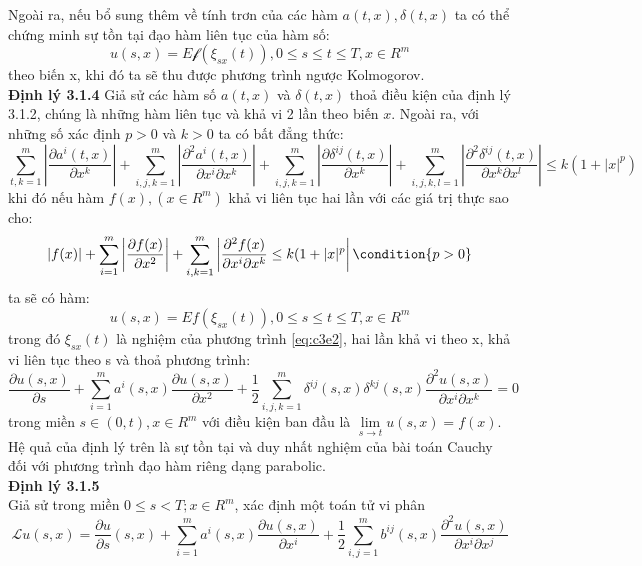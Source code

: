 \documentclass[14pt,a4paper]{article}
\numberwithin{equation}{section}
\begin{document}
Ngoài ra, nếu bổ sung thêm về tính trơn của các hàm $a(t,x),\delta(t,x)$ ta có thể chứng minh sự tồn tại đạo hàm liên tục của hàm số:
\begin{equation*}
	u(s,x)=E\mathscr{f}(\xi_{sx}(t)),0\leq s\leq t\leq T,x\in R^m
\end{equation*}
theo biến x, khi đó ta sẽ thu được phương trình ngược Kolmogorov.\\
\textbf{Định lý 3.1.4}
Giả sử các hàm số $a(t,x)$ và $\delta(t,x)$ thoả điều kiện của định lý 3.1.2, chúng là những hàm liên tục và khả vi 2 lần theo biến $x$. Ngoài ra, với những số xác định $p>0$ và $k>0$ ta có bất đẳng thức:
\begin{dmath*}
	\sum\limits_{t,k=1}^{m}\left|\dfrac{\partial a^i(t,x)}{\partial x^k}\right|+\sum\limits_{i,j,k=1}^{m}\left|\dfrac{\partial^2a^i(t,x)}{\partial x^i\partial x^k}\right|+\sum_{i,j,k=1}^{m}\left|\dfrac{\partial\delta^{ij}(t,x)}{\partial x^k} \right|+\sum_{i,j,k,l=1}^{m}\left|\dfrac{\partial^2\delta^{ij}(t,x)}{\partial x^k\partial x^l} \right|\leq k(1+|x|^p)	
\end{dmath*}
khi đó nếu hàm $f(x),(x\in R^m)$ khả vi liên tục hai lần với các giá trị thực sao cho:
\begin{equation*}
	\left|f(x)\right|+\sum_{i=1}^{m}\left|\dfrac{\partial f(x)}{\partial x^2} \right|+\sum_{i,k=1}^{m}\left|\dfrac{\partial^2f(x)}{\partial x^i \partial x^k}\leq k(1+|x|^p \right| \condition{p>0}
\end{equation*}
ta sẽ có hàm:
\begin{equation*}
	u(s,x)=Ef(\xi_{sx}(t)),0\leq s\leq t \leq T,x\in R^m
\end{equation*}
trong đó $\xi_{sx}(t)$ là nghiệm của phương trình \eqref{eq:c3e2}, hai lần khả vi theo x, khả vi liên tục theo s và thoả phương trình:
\begin{equation*}
	\dfrac{\partial u(s,x)}{\partial s}+\sum_{i=1}^{m}a^i(s,x)\dfrac{\partial u(s,x)}{\partial x^2}+\dfrac{1}{2}\sum_{i,j,k=1}^{m}\delta^{ij}(s,x)\delta^{kj}(s,x)\dfrac{\partial^2u(s,x)}{\partial x^i\partial x^k}=0
\end{equation*}
trong miền $s\in(0,t),x\in R^m$ với điều kiện ban đầu là $\lim\limits_{s\rightarrow t}u(s,x)=f(x)$.\\
Hệ quả của định lý trên là sự tồn tại và duy nhất nghiệm của bài toán Cauchy đối với phương trình đạo hàm riêng dạng parabolic.\\
\textbf{Định lý 3.1.5}\\
Giả sử trong miền $0\leq s<T;x\in R^m$, xác định một toán tử vi phân
\begin{equation*}
	\mathscr{L}u(s,x)=\dfrac{\partial u}{\partial s}(s,x)+\sum_{i=1}^{m}a^i(s,x)\dfrac{\partial u(s,x)}{\partial x^i}+\dfrac{1}{2}\sum_{i,j=1}^{m}b^{ij}(s,x)\dfrac{\partial^2u(s,x)}{\partial x^i\partial x^j}
\end{equation*}
\end{document}
